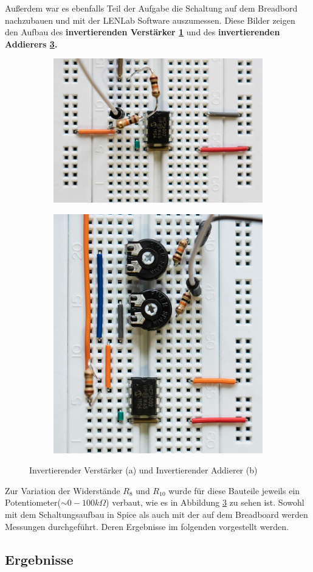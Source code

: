 \newpage
Außerdem war es ebenfalls Teil der Aufgabe die Schaltung auf dem Breadbord nachzubauen und mit der LENLab Software auszumessen. Diese Bilder zeigen den Aufbau des \textbf{invertierenden Verstärker \ref{invV}} und des \textbf{invertierenden Addierers \ref{invA}.}

\begin{figure}[h]
\centering
\begin{subfigure}{.5\textwidth}
  \centering
  \includegraphics[width=.4\linewidth]{pics/Invertierer_aufgebaut.jpg}
  \label{invV}
\end{subfigure}%
\begin{subfigure}{.5\textwidth}
  \centering
  \includegraphics[width=.4\linewidth]{pics/Addierer_aufgebaut.jpg}
  \label{invA}
\end{subfigure}
\caption{Invertierender Verstärker (a) und Invertierender Addierer (b)}
\end{figure}

Zur Variation der Widerstände $R_{8}$ und $R_{10}$ wurde für diese Bauteile jeweils ein Potentiometer($\sim 0-100k\Omega$) verbaut, wie es in Abbildung \ref{invA} zu sehen ist.
\newline Sowohl mit dem Schaltungsaufbau in Spice als auch mit der auf dem Breadboard werden Messungen durchgeführt. Deren Ergebnisse im folgenden vorgestellt werden.

\subsection{Ergebnisse}
